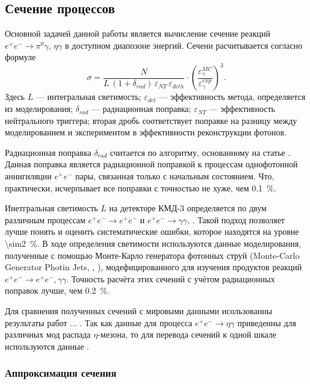 \subsection{Сечение процессов}

Основной задачей данной работы является вычисление сечение реакций
$e^+e^- \to \pi^0 \gamma, \, \eta \gamma$ в доступном диапозоне энергий.
Сечени расчитывается согласно формуле
\begin{equation}
\sigma = \frac{ N } { L \, (1+\delta_{rad}) \, \varepsilon_{NT} \,
\varepsilon_{deth}} \cdot  
\left( \frac{ {\varepsilon^{MC}_{\gamma}} }{ {\varepsilon^{exp}_{\gamma}} } \right)^3.
\end{equation}
Здесь $L$ --- интегральная светимость;
$\varepsilon_{det}$ --- эффективность метода, определяется из моделирования;
$\delta_{rad}$ --- радиационная поправка;
$\varepsilon_{NT}$ --- эффективность нейтрального триггера;
вторая дробь соответствует поправке на разницу между моделированием и экспериментом в эффективности
реконструкции фотонов.

Радиационная поправка $\delta_{rad}$ считается по алгоритму, основанному на статье \cite{Kuraev1985}.
Данная поправка является радиационной поправкой к процессам однофотонной аннигиляции $e^+ e^-$ пары, связанная только с начальным состоянием.
Что, практически, исчерпывает все поправки с точностью не хуже, чем \SI{0.1}{\percent}.

Инетгральная светимость $L$ на детекторе КМД-3 определяется по двум различным процессам $e^+e^- \to e^+e^-$ и $e^+e^- \to \gamma \gamma$, \cite{lumAkhmetshin2012b}.
Такой подход позволяет лучше понять и оценить систематические ошибки, которое находятся на уровне \SI{\sim2}{\percent}.
В ходе определения светимости используются данные моделирования, полученные с помощью Монте-Карло генератора фотонных струй (Monte-Carlo Generator Photin Jets, \cite{Arbuzov2006}, \cite{Actis2010}), модефицированного для изучения продуктов реакций  $e^+e^- \to e^+e^-, \gamma \gamma$.
Точность расчёта этих сечений с учётом радиационных поправок лучше, чем \SI{0.2}{\percent}.

Для сравнения полученных сечений с мировыми данными исользованны результаты работ ... .
Так как данные для процесса $e^+ e^- \to \eta \gamma$ приведенны для различных мод распада $\eta$-мезона, то для перевода сечений к одной шкале используются данные \cite{Beringer:1900zz}.

\subsubsection{Аппроксимация сечения}